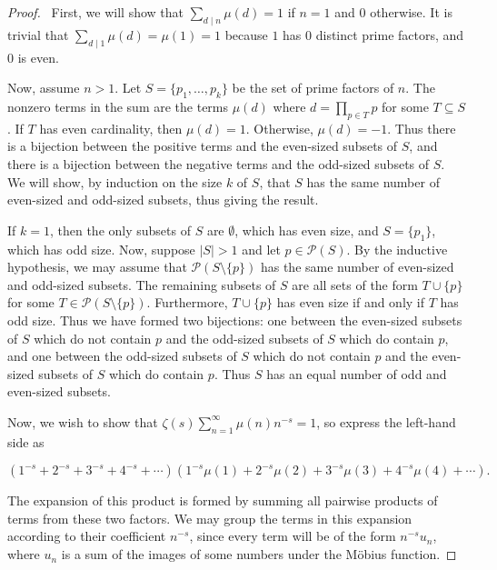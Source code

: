 \documentclass[12pt]{article}
\begin{document}
\begin{enumerate}[leftmargin=0cm,itemindent=.5cm,labelwidth=\itemindent,labelsep=0cm,align=left]
\begin{proof}

\ First, we will show that $\sum_{d \mid n} \mu (d) = 1$ if $n = 1$ and $0$ otherwise.  It is trivial that $\sum_{d \mid 1} \mu (d) =  \mu(1) = 1$ because $1$ has $0$ distinct prime factors, and 0 is even.

Now, assume $n > 1$.  Let $S = \{p_1,\dots ,p_k \}$ be the set of prime factors of $n$.  The nonzero terms in the sum are the terms $\mu(d)$ where $d = \prod\limits_{p \in T} p$ for some $T \subseteq S$.  If $T$ has even cardinality, then $\mu(d) = 1$.  Otherwise, $\mu(d) = -1$.  Thus there is a bijection between the positive terms and the even-sized subsets of $S$, and there is a bijection between the negative terms and the odd-sized subsets of $S$.  We will show, by induction on the size $k$ of $S$, that $S$ has the same number of even-sized and odd-sized subsets, thus giving the result.

If $k = 1$, then the only subsets of $S$ are $\emptyset$, which has even size, and $S = \{p_1\}$, which has odd size.  Now, suppose $|S| > 1$ and let $p \in \mathcal{P}(S)$.  By the inductive hypothesis, we may assume that $\mathcal{P}(S \setminus \{p \})$ has the same number of even-sized and odd-sized subsets.  The remaining subsets of $S$ are all sets of the form $T \cup \{p\}$ for some $T \in \mathcal{P}(S \setminus \{p \})$.  Furthermore, $T \cup \{p \}$ has even size if and only if $T$ has odd size.  Thus we have formed two bijections: one between the even-sized subsets of $S$ which do not contain $p$ and the odd-sized subsets of $S$ which do contain $p$, and one between the odd-sized subsets of $S$ which do not contain $p$ and the even-sized subsets of $S$ which do contain $p$.  Thus $S$ has an equal number of odd and even-sized subsets.

Now, we wish to show that $\zeta(s) \sum_{n=1}^\infty \mu (n) n^{-s} = 1$, so express the left-hand side as

$$(1^{-s} + 2^{-s} + 3^{-s} + 4^{-s} + \cdots)(1^{-s}\mu(1) + 2^{-s}\mu(2) + 3^{-s}\mu(3) + 4^{-s}\mu(4) + \cdots).$$

The expansion of this product is formed by summing all pairwise products of terms from these two factors.  We may group the terms in this expansion according to their coefficient $n^{-s}$, since every term will be of the form $n^{-s}u_n$, where $u_n$ is a sum of the images of some numbers under the M{\"o}bius function.


\end{proof}
\end{enumerate}
\end{document}
